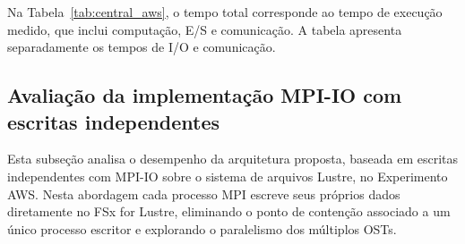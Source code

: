 Na Tabela~\ref{tab:central_aws}, o tempo total corresponde ao tempo de
execução medido, que inclui computação, E/S e comunicação. A tabela
apresenta separadamente os tempos de I/O e comunicação.

\begin{table}[H]
\centering
\caption{Desempenho do Experimento AWS com a implementação atual,
incluindo tempos de I/O, comunicação, tempo total, \textit{speedup},
eficiência e percentual de I/O. Este trabalho calcula a eficiência em
relação à base de 2~nós.}
\label{tab:central_aws}
\small
\setlength{\tabcolsep}{4pt}
\renewcommand{\arraystretch}{1.25}
\end{table}

\subsection{Avaliação da implementação MPI-IO com escritas independentes}
\label{sec:aws_mpiio}
Esta subseção analisa o desempenho da arquitetura proposta, baseada em
escritas independentes com MPI-IO sobre o sistema de arquivos
Lustre, no Experimento AWS. Nesta abordagem cada processo MPI escreve seus
próprios dados diretamente no FSx for Lustre, eliminando o ponto de
contenção associado a um único processo escritor e explorando o
paralelismo dos múltiplos OSTs.

